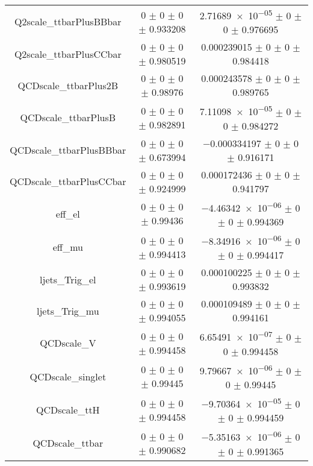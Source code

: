 \begin{table}
\begin{tabular}{ccc}
Q2scale\_ttbarPlusBBbar & \num{0} $\pm$ \num{0} $\pm$ \num{0} $\pm$ \num{0.933208} & \num{2.71689e-05} $\pm$ \num{0} $\pm$ \num{0} $\pm$ \num{0.976695}\\
Q2scale\_ttbarPlusCCbar & \num{0} $\pm$ \num{0} $\pm$ \num{0} $\pm$ \num{0.980519} & \num{0.000239015} $\pm$ \num{0} $\pm$ \num{0} $\pm$ \num{0.984418}\\
QCDscale\_ttbarPlus2B & \num{0} $\pm$ \num{0} $\pm$ \num{0} $\pm$ \num{0.98976} & \num{0.000243578} $\pm$ \num{0} $\pm$ \num{0} $\pm$ \num{0.989765}\\
QCDscale\_ttbarPlusB & \num{0} $\pm$ \num{0} $\pm$ \num{0} $\pm$ \num{0.982891} & \num{7.11098e-05} $\pm$ \num{0} $\pm$ \num{0} $\pm$ \num{0.984272}\\
QCDscale\_ttbarPlusBBbar & \num{0} $\pm$ \num{0} $\pm$ \num{0} $\pm$ \num{0.673994} & \num{-0.000334197} $\pm$ \num{0} $\pm$ \num{0} $\pm$ \num{0.916171}\\
QCDscale\_ttbarPlusCCbar & \num{0} $\pm$ \num{0} $\pm$ \num{0} $\pm$ \num{0.924999} & \num{0.000172436} $\pm$ \num{0} $\pm$ \num{0} $\pm$ \num{0.941797}\\
eff\_el & \num{0} $\pm$ \num{0} $\pm$ \num{0} $\pm$ \num{0.99436} & \num{-4.46342e-06} $\pm$ \num{0} $\pm$ \num{0} $\pm$ \num{0.994369}\\
eff\_mu & \num{0} $\pm$ \num{0} $\pm$ \num{0} $\pm$ \num{0.994413} & \num{-8.34916e-06} $\pm$ \num{0} $\pm$ \num{0} $\pm$ \num{0.994417}\\
ljets\_Trig\_el & \num{0} $\pm$ \num{0} $\pm$ \num{0} $\pm$ \num{0.993619} & \num{0.000100225} $\pm$ \num{0} $\pm$ \num{0} $\pm$ \num{0.993832}\\
ljets\_Trig\_mu & \num{0} $\pm$ \num{0} $\pm$ \num{0} $\pm$ \num{0.994055} & \num{0.000109489} $\pm$ \num{0} $\pm$ \num{0} $\pm$ \num{0.994161}\\
QCDscale\_V & \num{0} $\pm$ \num{0} $\pm$ \num{0} $\pm$ \num{0.994458} & \num{6.65491e-07} $\pm$ \num{0} $\pm$ \num{0} $\pm$ \num{0.994458}\\
QCDscale\_singlet & \num{0} $\pm$ \num{0} $\pm$ \num{0} $\pm$ \num{0.99445} & \num{9.79667e-06} $\pm$ \num{0} $\pm$ \num{0} $\pm$ \num{0.99445}\\
QCDscale\_ttH & \num{0} $\pm$ \num{0} $\pm$ \num{0} $\pm$ \num{0.994458} & \num{-9.70364e-05} $\pm$ \num{0} $\pm$ \num{0} $\pm$ \num{0.994459}\\
QCDscale\_ttbar & \num{0} $\pm$ \num{0} $\pm$ \num{0} $\pm$ \num{0.990682} & \num{-5.35163e-06} $\pm$ \num{0} $\pm$ \num{0} $\pm$ \num{0.991365}\\

\end{tabular}
\end{table}
